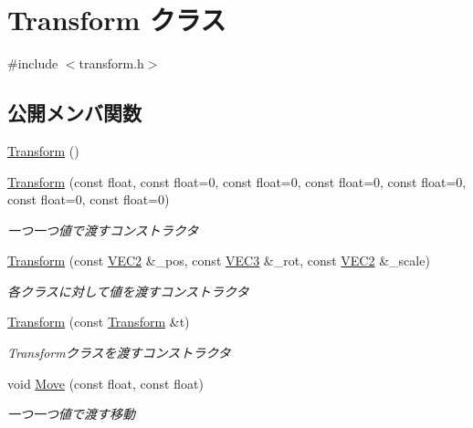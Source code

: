 \hypertarget{class_transform}{}\section{Transform クラス}
\label{class_transform}


{\ttfamily \#include $<$transform.\+h$>$}

\subsection*{公開メンバ関数}
\begin{DoxyCompactItemize}
\item 
\mbox{\hyperlink{class_transform_aa08ca4266efabc768973cdeea51945ab}{Transform}} ()
\item 
\mbox{\hyperlink{class_transform_a14fa5149a8efcc92e3d53d177b6daace}{Transform}} (const float, const float=0, const float=0, const float=0, const float=0, const float=0, const float=0)
\begin{DoxyCompactList}\small\item\em 一つ一つ値で渡すコンストラクタ \end{DoxyCompactList}\item 
\mbox{\hyperlink{class_transform_a06ab752a6562e1d0de11357525bd55a3}{Transform}} (const \mbox{\hyperlink{transform_8h_afb0c5e21d4133ff4f200992c0b534e1b}{V\+E\+C2}} \&\+\_\+pos, const \mbox{\hyperlink{transform_8h_a7e10f09694869ec22cb183f13a59289c}{V\+E\+C3}} \&\+\_\+rot, const \mbox{\hyperlink{transform_8h_afb0c5e21d4133ff4f200992c0b534e1b}{V\+E\+C2}} \&\+\_\+scale)
\begin{DoxyCompactList}\small\item\em 各クラスに対して値を渡すコンストラクタ \end{DoxyCompactList}\item 
\mbox{\hyperlink{class_transform_a7790f3c5dfe2b7fe7997af5f23e2ec7d}{Transform}} (const \mbox{\hyperlink{class_transform}{Transform}} \&t)
\begin{DoxyCompactList}\small\item\em Transformクラスを渡すコンストラクタ \end{DoxyCompactList}\item 
void \mbox{\hyperlink{class_transform_a45772ecb47b60d5b3f110613c3f15984}{Move}} (const float, const float)
\begin{DoxyCompactList}\small\item\em 一つ一つ値で渡す移動 \end{DoxyCompactList}\item 

\end{DoxyCompactItemize}
